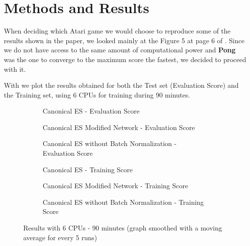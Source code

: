 \documentclass[10pt]{article} %
\begin{document}

\section{Methods and Results}

When deciding which Atari game we would choose to reproduce some of the results shown in the paper, we looked mainly at the Figure 5 at page 6 of \cite{back-to-basics}. Since we do not have access to the same amount of computational power and \textbf{Pong} was the one to converge to the maximum score the fastest, we decided to proceed with it.

With  we plot the results obtained for both the Test set (Evaluation Score) and the Training set, using 6 CPUs for training during 90 minutes. 

\begin{figure}[ht]
\captionsetup{justification=centering}
\begin{subfigure}[t]{.32\textwidth}
		\centering
		
		\caption{Canonical ES - Evaluation Score}
		\label{fig:canonical-eval}
\end{subfigure}
\begin{subfigure}[t]{.32\textwidth}
		\centering
		
		\caption{Canonical ES Modified Network - Evaluation Score}
		\label{fig:canonical-modified-eval}
\end{subfigure}
\begin{subfigure}[t]{.32\textwidth}
		\centering
		
		\caption{Canonical ES without Batch Normalization - Evaluation Score}
		\label{fig:canonical-without-bn-eval}
\end{subfigure}

\begin{subfigure}[t]{.32\textwidth}
		\centering
		
		\caption{Canonical ES - Training Score}
		\label{fig:canonical-train}
\end{subfigure}
\begin{subfigure}[t]{.32\textwidth}
		\centering
		
		\caption{Canonical ES Modified Network - Training Score}
		\label{fig:canonical-modified-train}
\end{subfigure}
\begin{subfigure}[t]{.32\textwidth}
		\centering
		
		\caption{Canonical ES without Batch Normalization - Training Score}
		\label{fig:canonical-without-bn-train}
\end{subfigure}
\caption{Results with 6 CPUs - 90 minutes (graph smoothed with a moving average for every 5 runs)}
\label{fig:results-90}
\end{figure}
\end{document}
